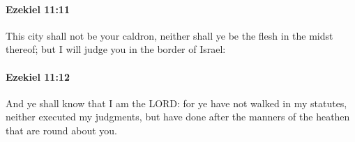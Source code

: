 		\paragraph{Ezekiel 11:11} %
			\label{EZEKIEL-11-11}

			This city shall not be your caldron, neither shall ye be the flesh in the midst thereof; but I will judge you in the border of Israel:


		\paragraph{Ezekiel 11:12} %
			\label{EZEKIEL-11-12}

			And ye shall know that I am the LORD: for ye have not walked in my statutes, neither executed my judgments, but have done after the manners of the heathen that are round about you.


